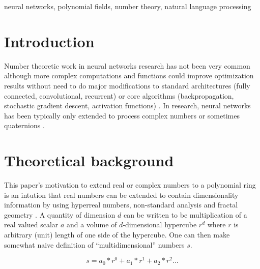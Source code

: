 \documentclass[preprint,12pt]{elsarticle}
\begin{document}
\begin{frontmatter}
\begin{keyword}
  neural networks, polynomial fields, number theory, natural language processing



\end{keyword}

\end{frontmatter}



\section{Introduction}
\label{intro}

Number theoretic work in neural networks research has not been very common although more complex computations and functions could improve optimization results without need to do major modifications to standard architectures (fully connected, convolutional, recurrent) or core algorithms (backpropagation, stochastic gradient descent, activation functions) \cite{haykinneurobook}. In research, neural networks has been typically only extended to process complex numbers or sometimes quaternions \cite{complexnnarticle1:1993:ICJNN, complexnnarticle2:2018:SICE, complexneuralnetworksbook, quaternionnnarticle:2018:ICJNN}.

\section{Theoretical background}
\label{background}

This paper's motivation to extend real or complex numbers to a polynomial ring is an intution that real numbers can be extended to contain dimensionality information by using hyperreal numbers, non-standard analysis and fractal geometry \cite{hyperrealarticle,nonstandardanalysisbook, fractalgeometrybook}. A quantity of dimension $d$ can be written to be multiplication of a real valued scalar $a$ and a volume of $d$-dimensional hypercube $r^d$ where $r$ is arbitrary (unit) length of one side of the hypercube. One can then make somewhat naive definition of ``multidimensional'' numbers $s$.

\begin{equation}
  s = a_0*r^0 + a_1*r^1 + a_2*r^2 ...
\end{equation}
\end{document}
